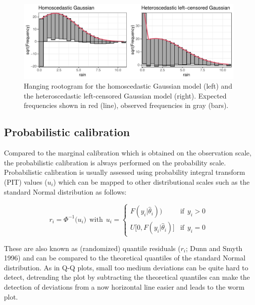 \documentclass[twoside]{report}
\begin{document}
\begin{figure}[!ht]\centering
    \includegraphics[width=\textwidth]{Stauffer-rootograms}
    \caption{\label{stauffer:fig1}
        Hanging rootogram for the homoscedastic Gaussian model (left)
        and the heteroscedastic left-censored Gaussian model (right).
        Expected frequencies shown in red (line), observed frequencies
        in gray (bars).
    }
\end{figure}


\subsection{Probabilistic calibration}

Compared to the marginal calibration which is obtained on the observation scale,
the probabilistic calibration is always performed on the probability scale.
Probabilistic calibration is usually assessed using probability integral
transform (PIT) values ($u_i$) which can be mapped to other distributional scales
such as the standard Normal distribution as follows:

$$
r_i = \Phi^{-1}\big(u_i)~~\text{with}~~u_i = \begin{cases}
     F(y_i | \hat{\theta}_i)\big) & \text{if}~~y_i > 0 \\
     U\big[0, F(y_i | \hat{\theta}_i)\big] & \text{if}~~y_i = 0
\end{cases}
$$

These are also known as (randomized) quantile residuals ($r_i$; Dunn and Smyth 1996)
and can be compared to the theoretical quantiles of the standard Normal
distribution. 
As in Q-Q plots, small too medium deviations can be quite hard to detect,
detrending the plot by subtracting the theoretical quantiles can make 
the detection of deviations from a now horizontal line easier and leads
to the worm plot.
\end{document}
